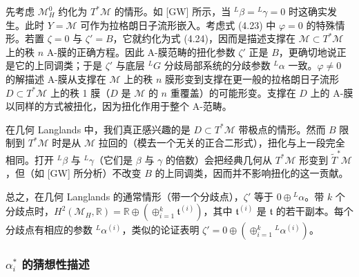 \documentclass[11pt,a4paper]{article}
\begin{document}

先考虑 $\mathcal{M}_H^0$ 约化为 $T^*\mathcal{M}$ 的情形。如 [GW] 所示，当 ${}^L\beta={}^L\gamma=0$ 时这确实发生。此时 $Y=\mathcal{M}$ 可作为拉格朗日子流形嵌入。考虑式 (4.23) 中 $\varphi=0$ 的特殊情形。若置 $\zeta=0$ 与 $\zeta'=B$，它就约化为式 (4.24)，因而是描述支撑在 $\mathcal{M}\subset T^*\mathcal{M}$ 上的秩 $n$ A-膜的正确方程。因此 A-膜范畴的扭化参数 $\zeta'$ 正是 $B$，更确切地说正是它的上同调类；于是 $\zeta'$ 与底层 ${}^LG$ 分歧局部系统的分歧参数 ${}^L\alpha$ 一致。$\varphi\neq0$ 的解描述 A-膜从支撑在 $\mathcal{M}$ 上的秩 $n$ 膜形变到支撑在更一般的拉格朗日子流形 $D\subset T^*\mathcal{M}$ 上的秩 1 膜（$D$ 是 $\mathcal{M}$ 的 $n$ 重覆盖）的可能形变。支撑在 $D$ 上的 A-膜以同样的方式被扭化，因为扭化作用于整个 A-范畴。


在几何 Langlands 中，我们真正感兴趣的是 $D\subset T^*\mathcal{M}$ 带极点的情形。然而 $B$ 限制到 $T^*\mathcal{M}$ 时是从 $\mathcal{M}$ 拉回的（模去一个无关的正合二形式），扭化与上一段完全相同。打开 ${}^L\beta$ 与 ${}^L\gamma$（它们是 $\beta$ 与 $\gamma$ 的倍数）会把经典几何从 $T^*\mathcal{M}$ 形变到 $\widetilde{T}^*\mathcal{M}$，但（如 [GW] 所分析）不改变 $B$ 的上同调类，因而并不影响扭化的这一贡献。


总之，在几何 Langlands 的通常情形（带一个分歧点），$\zeta'$ 等于 $0\oplus{}^L\alpha$。带 $k$ 个分歧点时，$H^2(\mathcal{M}_H,\mathbb{R})=\mathbb{R}\oplus(\oplus_{i=1}^{k}\mathfrak{t}^{(i)})$，其中 $\mathfrak{t}^{(i)}$ 是 $\mathfrak{t}$ 的若干副本。每个分歧点有相应的参数 ${}^L\alpha^{(i)}$，类似的论证表明 $\zeta'=0\oplus(\oplus_{i=1}^{k}{}^L\alpha^{(i)})$。

\subsubsection{\texorpdfstring{$\alpha_i^*$}{αi*} 的猜想性描述}
\end{document}
